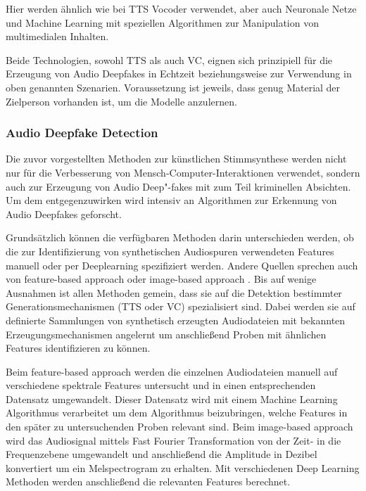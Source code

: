 Hier werden ähnlich wie bei TTS Vocoder verwendet, aber auch Neuronale Netze und Machine Learning mit speziellen Algorithmen zur Manipulation von multimedialen Inhalten.

Beide Technologien, sowohl TTS als auch VC, eignen sich prinzipiell für die Erzeugung von Audio Deepfakes in Echtzeit beziehungsweise zur Verwendung in oben genannten Szenarien.
Voraussetzung ist jeweils, dass genug Material der Zielperson vorhanden ist, um die Modelle anzulernen.
\clearpage

\subsubsection{Audio Deepfake Detection}
Die zuvor vorgestellten Methoden zur künstlichen Stimmsynthese werden nicht nur für die Verbesserung von Mensch-Computer-Interaktionen verwendet, sondern auch zur Erzeugung von Audio Deep"-fakes mit zum Teil kriminellen Absichten.
Um dem entgegenzuwirken wird intensiv an Algorithmen zur Erkennung von Audio Deepfakes geforscht.

Grundsätzlich können die verfügbaren Methoden darin unterschieden werden, ob die zur Identifizierung von synthetischen Audiospuren verwendeten Features manuell oder per Deeplearning spezifiziert werden.
Andere Quellen sprechen auch von feature-based approach oder image-based approach \citep[][]{Khochare2021}.
Bis auf wenige Ausnahmen ist allen Methoden gemein, dass sie auf die Detektion bestimmter Generationsmechanismen (TTS oder VC) spezialisiert sind.
Dabei werden sie auf definierte Sammlungen von synthetisch erzeugten Audiodateien mit bekannten Erzeugungsmechanismen angelernt um anschließend Proben mit ähnlichen Features identifizieren zu können.

Beim feature-based approach werden die einzelnen Audiodateien manuell auf verschiedene spektrale Features untersucht und in einen entsprechenden Datensatz umgewandelt.
Dieser Datensatz wird mit einem Machine Learning Algorithmus verarbeitet um dem Algorithmus beizubringen, welche Features in den später zu untersuchenden Proben relevant sind.
Beim image-based approach wird das Audiosignal mittels Fast Fourier Transformation von der Zeit- in die Frequenzebene umgewandelt und anschließend die Amplitude in Dezibel konvertiert um ein Melspectrogram zu erhalten.
Mit verschiedenen Deep Learning Methoden werden anschließend die relevanten Features berechnet.

